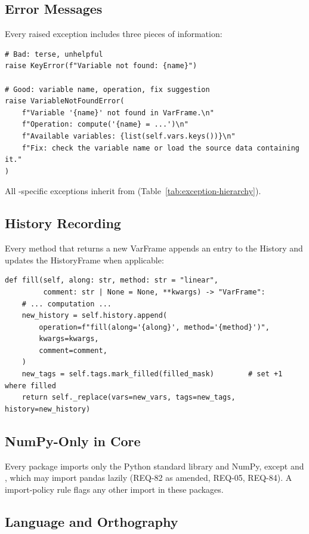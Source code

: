 \subsection{Error Messages}

Every raised exception includes three pieces of information:

\begin{lstlisting}
# Bad: terse, unhelpful
raise KeyError(f"Variable not found: {name}")

# Good: variable name, operation, fix suggestion
raise VariableNotFoundError(
    f"Variable '{name}' not found in VarFrame.\n"
    f"Operation: compute('{name} = ...')\n"
    f"Available variables: {list(self.vars.keys())}\n"
    f"Fix: check the variable name or load the source data containing it."
)
\end{lstlisting}

All \itc{}-specific exceptions inherit from 
(Table~\ref{tab:exception-hierarchy}).

\subsection{History Recording}

Every method that returns a new VarFrame appends an entry to the History
and updates the HistoryFrame when applicable:

\begin{lstlisting}
def fill(self, along: str, method: str = "linear",
         comment: str | None = None, **kwargs) -> "VarFrame":
    # ... computation ...
    new_history = self.history.append(
        operation=f"fill(along='{along}', method='{method}')",
        kwargs=kwargs,
        comment=comment,
    )
    new_tags = self.tags.mark_filled(filled_mask)        # set +1 where filled
    return self._replace(vars=new_vars, tags=new_tags, history=new_history)
\end{lstlisting}

\subsection{NumPy-Only in Core}

Every \itc{} package imports only the Python standard library and
NumPy, except  and , which may import pandas
lazily (REQ-82 as amended, REQ-05, REQ-84). A 
import-policy rule flags any other import in these packages.

\subsection{Language and Orthography}

